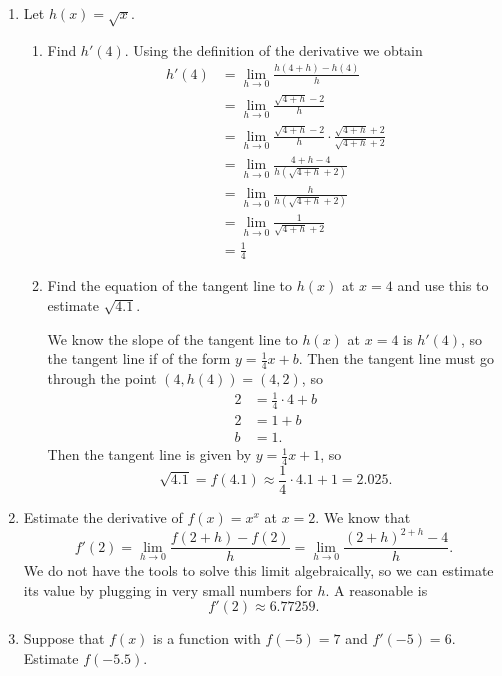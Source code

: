 \documentclass[11pt]{article}
\begin{document}
\begin{enumerate}
\item Let $h(x) = \sqrt{x}$.
  \begin{enumerate}
  \item Find $h'(4)$.
  \vfill
  {\color{blue}
    Using the definition of the derivative we obtain
    \begin{align*}
      h'(4) &= \lim_{h\to 0} \frac{h(4+h)-h(4)}{h}\\
      &= \lim_{h\to 0} \frac{\sqrt{4+h}-2}{h}\\
      &= \lim_{h\to 0} \frac{\sqrt{4+h}-2}{h}\cdot\frac{\sqrt{4+h}+2}{\sqrt{4+h}+2}\\
      &= \lim_{h\to 0} \frac{4+h-4}{h\left(\sqrt{4+h}+2\right)}\\
      &= \lim_{h\to 0} \frac{h}{h\left(\sqrt{4+h}+2\right)}\\
      &= \lim_{h\to 0} \frac{1}{\sqrt{4+h}+2}\\
      &= \frac{1}{4}
    \end{align*}
  }
    \vfill
  \item Find the equation of the tangent line to $h(x)$ at $x=4$ and
    use this to estimate $\sqrt{4.1}$.
    \vfill

    {\color{blue}
      We know the slope of the tangent line to $h(x)$ at $x=4$ is
      $h'(4)$, so the tangent line if of the form $y= \frac{1}{4}x+b$.
      Then the tangent line must go through the point
      $(4,h(4))=(4,2)$, so
      \begin{align*}
        2 &= \frac{1}{4}\cdot 4 + b\\
        2 &= 1 + b\\
        b &= 1.
      \end{align*}
      Then the tangent line is given by $y=\frac{1}{4}x+1$, so
      \[
      \sqrt{4.1}=f(4.1)\approx \frac{1}{4}\cdot 4.1 + 1 = 2.025.
      \]
    }

    \vfill
  \end{enumerate}
  
  \newpage

\item Estimate the derivative of $f(x) = x^x$ at $x=2$.
  \vfill
  {\color{blue}
    We know that
    \[
    f'(2) = \lim_{h\to 0} \frac{f(2+h)-f(2)}{h} = \lim_{h\to 0}
    \frac{(2+h)^{2+h} - 4}{h}.
    \]
    We do not have the tools to solve this limit algebraically, so we
    can estimate its value by plugging in very small numbers for $h$.
    A reasonable is
    \[
    f'(2) \approx 6.77259.
    \]
  }
  \vfill

\item Suppose that $f(x)$ is a function with $f(-5) = 7$ and $f'(-5) =
  6$.  Estimate $f(-5.5)$.
  \vfill
  {\color{blue}

}
\end{enumerate}
\end{document}
